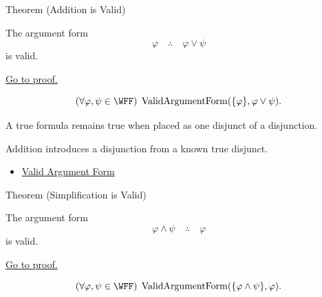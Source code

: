 \begin{theorembox}{Theorem (Addition is Valid)}
\begin{theorem}
\label{thm:addition-validity-propositional-logic}
The argument form
\[
\varphi \quad\therefore\quad \varphi\lor\psi
\]
is valid.

\noindent\hyperref[prf:addition-validity-propositional-logic]{Go to proof.}
\end{theorem}
\end{theorembox}

\begin{remark*}
\[
(\forall\varphi,\psi\in\WFF)\;\operatorname{ValidArgumentForm}(\{\varphi\},\varphi\lor\psi).
\]
\end{remark*}

\begin{remark*}
A true formula remains true when placed as one disjunct of a disjunction.
\end{remark*}

\begin{remark*}[Interpretation]
Addition introduces a disjunction from a known true disjunct.
\end{remark*}

\begin{dependencies}
\begin{itemize}
  \item \hyperref[def:valid-argument-form-propositional-logic]{Valid Argument Form}
\end{itemize}
\end{dependencies}

\begin{theorembox}{Theorem (Simplification is Valid)}
\begin{theorem}
\label{thm:simplification-validity-propositional-logic}
The argument form
\[
\varphi\land\psi \quad\therefore\quad \varphi
\]
is valid.

\noindent\hyperref[prf:simplification-validity-propositional-logic]{Go to proof.}
\end{theorem}
\end{theorembox}

\begin{remark*}
\[
(\forall\varphi,\psi\in\WFF)\;\operatorname{ValidArgumentForm}(\{\varphi\land\psi\},\varphi).
\]
\end{remark*}

